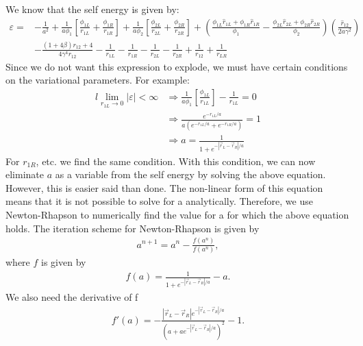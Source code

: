 We know that the self energy is given by:
\begin{align}
\varepsilon  =  &- \frac{1}{{{a^2}}} + \frac{1}{{a{\phi _1}}}\left[ {\frac{{{\phi _{1L}}}}{{{r_{1L}}}} + \frac{{{\phi _{1R}}}}{{{r_{1R}}}}} \right] + \frac{1}{{a{\phi _2}}}\left[ {\frac{{{\phi _{2L}}}}{{{r_{2L}}}} + \frac{{{\phi _{2R}}}}{{{r_{2R}}}}} \right] + \left( {\frac{{{\phi _{1L}}{{\hat r}_{1L}} + {\phi _{1R}}{{\hat r}_{1R}}}}{{{\phi _1}}} - \frac{{{\phi _{2L}}{{\hat r}_{2L}} + {\phi _{2R}}{{\hat r}_{2R}}}}{{{\phi _2}}}} \right)\left( {\frac{{{{\hat r}_{12}}}}{{2a{\gamma ^2}}}} \right)\nonumber\\&
 - \frac{{\left( {1 + 4\beta } \right){r_{12}} + 4}}{{4{\gamma ^4}{r_{12}}}} - \frac{1}{{{r_{1L}}}} - \frac{1}{{{r_{1R}}}} - \frac{1}{{{r_{2L}}}} - \frac{1}{{{r_{2R}}}} + \frac{1}{{{r_{12}}}} + \frac{1}{{{r_{LR}}}}
\end{align}
Since we do not want this expression to explode, we must have certain conditions on the variational parameters. For example:
\begin{align}{l}
\mathop {\lim }\limits_{{r_{1L}} \to 0} \left| \varepsilon  \right| < \infty  &\Rightarrow \frac{1}{{a{\phi _1}}}\left[ {\frac{{{\phi _{1L}}}}{{{r_{1L}}}}} \right] - \frac{1}{{{r_{1L}}}} = 0\nonumber\\& \Rightarrow \frac{{{e^{ - {r_{1L}}/a}}}}{{a\left( {{e^{ - {r_{1L}}/a}} + {e^{ - {r_{1R}}/a}}} \right)}} = 1\nonumber\\&
 \Rightarrow a = \frac{1}{{1 + {e^{ - \left| {{{\vec r}_L} - {{\vec r}_R}} \right|/a}}}}
\end{align}
For $r_{1R}$, etc. we find the same condition. With this condition, we can now eliminate $a$ as a variable from the self energy by solving the above equation.\\
However, this is easier said than done. The non-linear form of this equation means that it is not possible to solve for a analytically. Therefore, we use Newton-Rhapson to numerically find the value for a for which the above equation holds. The iteration scheme for Newton-Rhapson is given by
\begin{align}
{a^{n + 1}} = {a^n} - \frac{{f\left( {{a^n}} \right)}}{{f\left( {{a^n}} \right)}},
\end{align}
where $f$ is given by
\begin{align}
f\left( a \right) = \frac{1}{{1 + {e^{ - \left| {{{\vec r}_L} - {{\vec r}_R}} \right|/a}}}} - a.
\end{align}
We also need the derivative of f
\begin{align}
f'\left( a \right) =  - \frac{{\left| {{{\vec r}_L} - {{\vec r}_R}} \right|{e^{ - \left| {{{\vec r}_L} - {{\vec r}_R}} \right|/a}}}}{{{{\left( {a + a{e^{ - \left| {{{\vec r}_L} - {{\vec r}_R}} \right|/a}}} \right)}^2}}} - 1.
\end{align}












